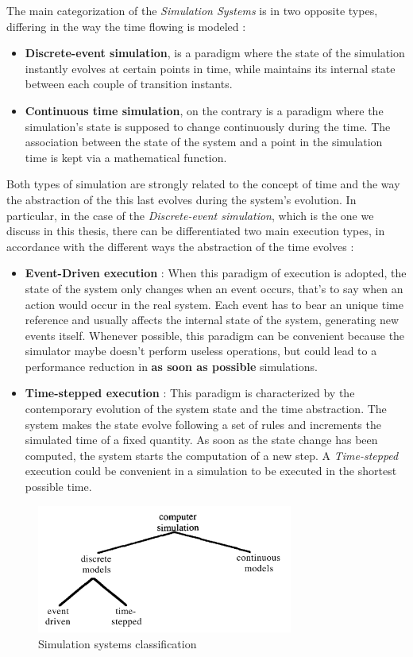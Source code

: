 \documentclass[12pt,a4paper,fleqn]{report}
\begin{document}
The main categorization of the \textit{Simulation Systems} is in two opposite types, differing in the way the time flowing is modeled :
\begin{itemize}
\item
\textbf{Discrete-event simulation}, is a paradigm where the state of the simulation instantly evolves at certain points in time, while maintains its internal state between each couple of transition instants.
\item
\textbf{Continuous time simulation}, on the contrary is a paradigm where the simulation's state is supposed to change continuously during the time. The association between the state of the system and a point in the simulation time is kept via a mathematical function.
\end{itemize}
Both types of simulation are strongly related to the concept of time and the way the abstraction of the this last evolves during the system's evolution. In particular, in the case of the \textit{Discrete-event simulation}, which is the one we discuss in this thesis, there can be differentiated two main execution types, in accordance with the different ways the abstraction of the time evolves :
\begin{itemize}
\item
\textbf{Event-Driven execution} : When this paradigm of execution is adopted, the state of the system only changes when an event occurs, that's to say when an action would occur in the real system. Each event has to bear an unique time reference and usually affects the internal state of the system, generating new events itself. Whenever possible, this paradigm can be convenient because the simulator maybe doesn't perform useless operations, but could lead to a performance reduction in \textbf{as soon as possible} simulations.
\item
\textbf{Time-stepped execution} : This paradigm is characterized by the contemporary evolution of the system state and the time abstraction. The system makes the state evolve following a set of rules and increments the simulated time of a fixed quantity. As soon as the state change has been computed, the system starts the computation of a new step. A \textit{Time-stepped} execution could be convenient in a simulation to be executed in the shortest possible time.
\end{itemize}

\begin{figure}[ht!]
\centering
    \includegraphics[width=0.75\textwidth]{simulation_paradigms}
    \caption{ Simulation systems classification \cite{0}  }
\end{figure}
\end{document}
